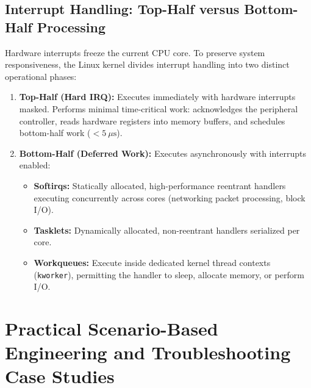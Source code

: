 \subsection{Interrupt Handling: Top-Half versus Bottom-Half Processing}
Hardware interrupts freeze the current CPU core. To preserve system responsiveness, the Linux kernel divides interrupt handling into two distinct operational phases:
\begin{enumerate}
    \item \textbf{Top-Half (Hard IRQ):} Executes immediately with hardware interrupts masked. Performs minimal time-critical work: acknowledges the peripheral controller, reads hardware registers into memory buffers, and schedules bottom-half work ($< 5\ \mu\text{s}$).
    \item \textbf{Bottom-Half (Deferred Work):} Executes asynchronously with interrupts enabled:
    \begin{itemize}
        \item \textbf{Softirqs:} Statically allocated, high-performance reentrant handlers executing concurrently across cores (networking packet processing, block I/O).
        \item \textbf{Tasklets:} Dynamically allocated, non-reentrant handlers serialized per core.
        \item \textbf{Workqueues:} Execute inside dedicated kernel thread contexts (\texttt{kworker}), permitting the handler to sleep, allocate memory, or perform I/O.
    \end{itemize}
\end{enumerate}



\section{Practical Scenario-Based Engineering and Troubleshooting Case Studies}
\label{sec:os_troubleshooting_cases}


